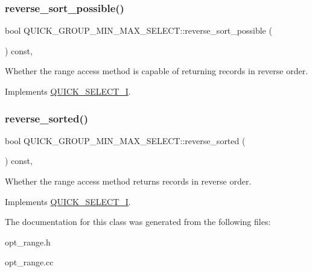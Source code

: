 \subsubsection{\texorpdfstring{reverse\+\_\+sort\+\_\+possible()}{reverse\_sort\_possible()}}
{\footnotesize\ttfamily bool Q\+U\+I\+C\+K\+\_\+\+G\+R\+O\+U\+P\+\_\+\+M\+I\+N\+\_\+\+M\+A\+X\+\_\+\+S\+E\+L\+E\+C\+T\+::reverse\+\_\+sort\+\_\+possible (\begin{DoxyParamCaption}{ }\end{DoxyParamCaption}) const\hspace{0.3cm}{\ttfamily [inline]}, {\ttfamily [virtual]}}

Whether the range access method is capable of returning records in reverse order. 

Implements \mbox{\hyperlink{classQUICK__SELECT__I_a485c91ca6490bcf1de2eed5a7181a800}{Q\+U\+I\+C\+K\+\_\+\+S\+E\+L\+E\+C\+T\+\_\+I}}.

\mbox{\label{classQUICK__GROUP__MIN__MAX__SELECT_a4e5ee5272e481df74aeca818374c50ec}} 
\subsubsection{\texorpdfstring{reverse\+\_\+sorted()}{reverse\_sorted()}}
{\footnotesize\ttfamily bool Q\+U\+I\+C\+K\+\_\+\+G\+R\+O\+U\+P\+\_\+\+M\+I\+N\+\_\+\+M\+A\+X\+\_\+\+S\+E\+L\+E\+C\+T\+::reverse\+\_\+sorted (\begin{DoxyParamCaption}{ }\end{DoxyParamCaption}) const\hspace{0.3cm}{\ttfamily [inline]}, {\ttfamily [virtual]}}

Whether the range access method returns records in reverse order. 

Implements \mbox{\hyperlink{classQUICK__SELECT__I_a686e8770fe10ac41bafdcf6d0c74dff3}{Q\+U\+I\+C\+K\+\_\+\+S\+E\+L\+E\+C\+T\+\_\+I}}.



The documentation for this class was generated from the following files\+:\begin{DoxyCompactItemize}
\item 
opt\+\_\+range.\+h\item 
opt\+\_\+range.\+cc\end{DoxyCompactItemize}
